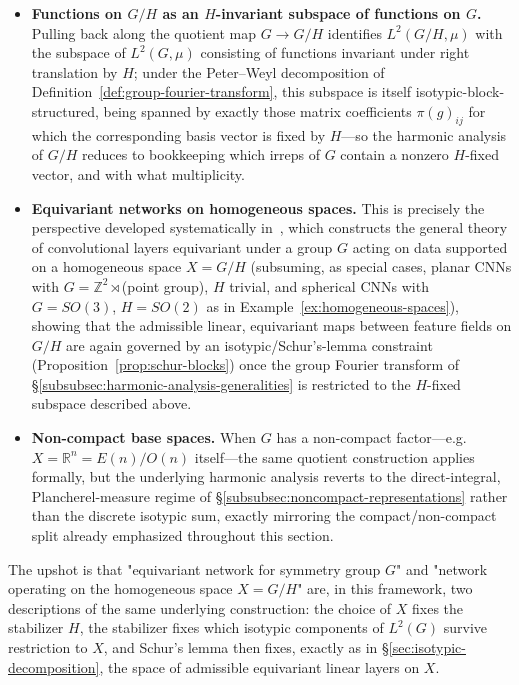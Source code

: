 \documentclass[mathematics,review,submit,moreauthors]{Definitions/mdpi}
\begin{document}
\begin{itemize}
    \item \textbf{Functions on $G/H$ as an $H$-invariant subspace of
    functions on $G$.} Pulling back along the quotient map $G \to G/H$
    identifies $L^2(G/H,\mu)$ with the subspace of $L^2(G,\mu)$ consisting
    of functions invariant under right translation by $H$; under the
    Peter--Weyl decomposition of
    Definition~\ref{def:group-fourier-transform}, this subspace is itself
    isotypic-block-structured, being spanned by exactly those matrix
    coefficients $\pi(g)_{ij}$ for which the corresponding basis vector is
    fixed by $H$---so the harmonic analysis of $G/H$ reduces to bookkeeping
    which irreps of $G$ contain a nonzero $H$-fixed vector, and with what
    multiplicity.
    \item \textbf{Equivariant networks on homogeneous spaces.} This is
    precisely the perspective developed systematically
    in~\cite{cohen2019anips}, which constructs the general theory of
    convolutional layers equivariant under a group $G$ acting on data
    supported on a homogeneous space $X = G/H$ (subsuming, as special cases,
    planar CNNs with $G = \mathbb{Z}^2 \rtimes$(point group), $H$ trivial,
    and spherical CNNs with $G = SO(3)$, $H = SO(2)$ as in
    Example~\ref{ex:homogeneous-spaces}), showing that the admissible
    linear, equivariant maps between feature fields on $G/H$ are again
    governed by an isotypic/Schur's-lemma constraint
    (Proposition~\ref{prop:schur-blocks}) once the group Fourier transform
    of \S\ref{subsubsec:harmonic-analysis-generalities} is restricted to the
    $H$-fixed subspace described above.
    \item \textbf{Non-compact base spaces.} When $G$ has a non-compact
    factor---e.g.\ $X = \mathbb{R}^n = E(n)/O(n)$ itself---the same
    quotient construction applies formally, but the underlying harmonic
    analysis reverts to the direct-integral, Plancherel-measure regime of
    \S\ref{subsubsec:noncompact-representations} rather than the discrete
    isotypic sum, exactly mirroring the compact/non-compact split already
    emphasized throughout this section.
\end{itemize}

The upshot is that "equivariant network for symmetry group $G$" and
"network operating on the homogeneous space $X = G/H$" are, in this
framework, two descriptions of the same underlying construction: the choice
of $X$ fixes the stabilizer $H$, the stabilizer fixes which isotypic
components of $L^2(G)$ survive restriction to $X$, and Schur's lemma then
fixes, exactly as in \S\ref{sec:isotypic-decomposition}, the space of
admissible equivariant linear layers on $X$.
\end{document}
